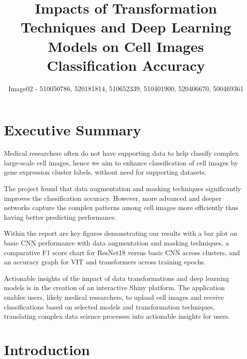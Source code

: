 \documentclass[letterpaper,9pt,twocolumn,twoside,]{pinp}
\title{Impacts of Transformation Techniques and Deep Learning Models on
Cell Images Classification Accuracy}
\author[]{Image02 - 510050786, 520181814, 510652339, 510401900,
520406670, 500469361}
\affil[a]{The University of Sydney}
\begin{document}
\verticaladjustment{-2pt}

\maketitle
\thispagestyle{firststyle}



\hypertarget{executive-summary}{%
\section{Executive Summary}\label{executive-summary}}

Medical researchers often do not have supporting data to help classify
complex large-scale cell images, hence we aim to enhance classification
of cell images by gene expression cluster labels, without need for
supporting datasets.

The project found that data augmentation and masking techniques
significantly improves the classification accuracy. However, more
advanced and deeper networks capture the complex patterns among cell
images more efficiently thus having better predicting performance.

Within the report are key figures demonstrating our results with a bar
plot on basic CNN performance with data augmentation and masking
techniques, a comparative F1 score chart for ResNet18 versus basic CNN
across clusters, and an accuracy graph for VIT and transformers across
training epochs.

Actionable insights of the impact of data transformations and deep
learning models is in the creation of an interactive Shiny platform. The
application enables users, likely medical researchers, to upload cell
images and receive classifications based on selected models and
transformation techniques, translating complex data science processes
into actionable insights for users.

\hypertarget{introduction}{%
\section{Introduction}\label{introduction}}
\end{document}
